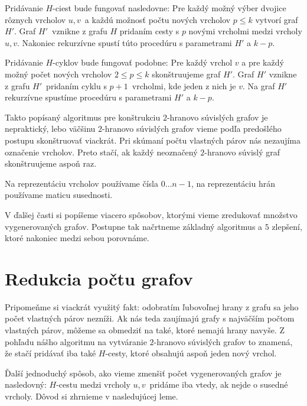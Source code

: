 Pridávanie $H$-ciest bude fungovať nasledovne: Pre každý možný výber dvojice rôznych
vrcholov $u, v$ a každú možnosť počtu nových vrcholov $p \leq k$ vytvorí graf $H'$.
Graf $H'$ vznikne z grafu $H$ pridaním cesty s $p$ novými vrcholmi medzi vrcholy $u, v$.
Nakoniec rekurzívne spustí túto procedúru s parametrami $H'$ a $k - p$.

Pridávanie $H$-cyklov bude fungovať podobne: Pre každý vrchol $v$ a pre každý možný
počet nových vrcholov $2 \leq p \leq k$ skonštruujeme graf $H'$. Graf $H'$ vznikne z
grafu $H'$ pridaním cyklu s $p+1$ vrcholmi, kde jeden z nich je $v$. Na graf $H'$
rekurzívne spustíme procedúru s parametrami $H'$ a $k - p$.

Takto popísaný algoritmus pre konštrukciu $2$-hranovo súvislých grafov je nepraktický,
lebo väčšinu $2$-hranovo súvislých grafov vieme podľa predošlého postupu skonštruovať
viackrát. Pri skúmaní počtu vlastných párov nás nezaujíma označenie vrcholov. Preto stačí,
ak každý neoznačený $2$-hranovo súvislý graf skonštruujeme aspoň raz.

Na reprezentáciu vrcholov používame čísla $0 \ldots n-1$, na reprezentáciu hrán používame
maticu susednosti.

V ďalšej časti si popíšeme viacero spôsobov, ktorými vieme zredukovať množstvo vygenerovaných
grafov. Postupne tak načrtneme základný algoritmus a $5$ zlepšení, ktoré nakoniec medzi
sebou porovnáme.

\section{Redukcia počtu grafov}

Pripomeňme si viackrát využitý fakt: odobratím ľubovoľnej hrany z grafu sa jeho počet vlastných
párov nezníži. Ak nás teda zaujímajú grafy s najväčším počtom vlastných párov, môžeme sa obmedziť
na také, ktoré nemajú hrany navyše. Z pohľadu nášho algoritmu na vytváranie $2$-hranovo súvislých
grafov to znamená, že stačí pridávať iba také $H$-cesty, ktoré obsahujú aspoň jeden nový vrchol.

Ďalší jednoduchý spôsob, ako vieme zmenšiť počet vygenerovaných grafov je nasledovný: $H$-cestu
medzi vrcholy $u, v$ pridáme iba vtedy, ak nejde o susedné vrcholy. Dôvod si zhrnieme v nasledujúcej
leme.

